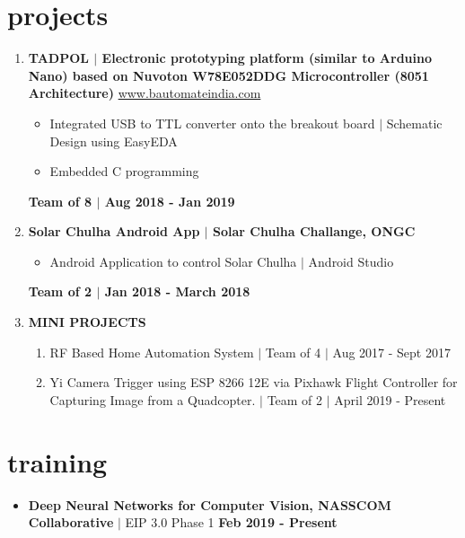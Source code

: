 \documentclass[margin,line]{res}
\begin{document}
\begin{resume}
		\section{\sc projects}
			
			\begin{enumerate}

				\item \textbf{TADPOL $\vert$ Electronic prototyping platform (similar to Arduino Nano) based on Nuvoton W78E052DDG Microcontroller (8051 Architecture) } \newline \url{www.bautomateindia.com} 
					\begin{itemize}
						\item Integrated USB to TTL converter onto the breakout board  $\vert$ Schematic Design using EasyEDA 
						\item Embedded C programming
					\end{itemize}
					\null \hfill \textbf{Team of 8 $\vert$ Aug 2018 - Jan 2019} \newline
				\item \textbf{Solar Chulha Android App  $\vert$  Solar Chulha Challange, ONGC}
					\begin{itemize}	
						\item Android Application to control Solar Chulha  $\vert$  Android Studio
					\end{itemize}
					\null \hfill \textbf{Team of 2 $\vert$ Jan 2018 - March 2018} \newline
				\item \textbf{MINI PROJECTS}
					\begin{enumerate}
						\item RF Based Home Automation System $\vert$ Team of 4 $\vert$ Aug 2017 - Sept 2017
						\item Yi Camera Trigger using ESP 8266 12E via Pixhawk Flight Controller for Capturing Image from a Quadcopter. $\vert$ Team of 2 $\vert$ April 2019 - Present
					\end{enumerate}
			\end{enumerate}

		\section{\sc training}
	
			\begin{itemize}
				\item \textbf{Deep Neural Networks for Computer Vision, NASSCOM Collaborative} $\vert$ EIP 3.0 Phase 1 \newline
				\null \hfill \textbf{Feb 2019 - Present} \newline
			\end{itemize}


\end{resume}
\end{document}
